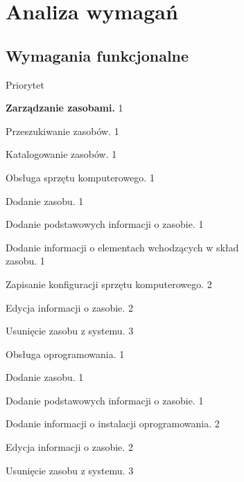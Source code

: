 \section{Analiza wymagań}

\subsection{Wymagania funkcjonalne}
\hfill Priorytet
\begin{myEnumerate}
\item\label{f1} \textbf{Zarządzanie zasobami.} 
\hfill 1
	\begin{myEnumerate}
	\item\label{f2} Przeszukiwanie zasobów. 
	\hfill 1
	\item\label{f3} Katalogowanie zasobów. 
	\hfill 1
	\begin{myEnumerate}

	\item\label{f4} Obsługa sprzętu komputerowego. 
	\hfill 1
	\begin{myEnumerate}
		\item\label{f5} Dodanie zasobu. 
		\hfill 1
		\begin{myEnumerate}
		\item\label{f6} Dodanie podstawowych informacji o zasobie.
		 \hfill 1
		\item\label{f7} Dodanie informacji o elementach wchodzących w skład \\  zasobu. 
		\hfill 1
		\item\label{f8} Zapisanie konfiguracji sprzętu komputerowego. 
		\hfill 2
		\end{myEnumerate}
		\item\label{f9} Edycja informacji o zasobie. 
		\hfill 2
		\item\label{f10} Usunięcie zasobu z systemu. 
		\hfill 3
	\end{myEnumerate}

	\item\label{f11} Obsługa oprogramowania. 
	\hfill 1

	\begin{myEnumerate}
		\item\label{f12} Dodanie zasobu. 
		\hfill 1
		\begin{myEnumerate}
			\item\label{f13} Dodanie podstawowych informacji o zasobie. 
			\hfill 1
			\item\label{f14} Dodanie informacji o instalacji oprogramowania. 
			\hfill 2
		\end{myEnumerate}
		\item\label{f15} Edycja informacji o zasobie. 
		\hfill 2
		\item\label{f16} Usunięcie zasobu z systemu. 
		\hfill 3
	\end{myEnumerate}


\end{myEnumerate}
\end{myEnumerate}
\end{myEnumerate}
